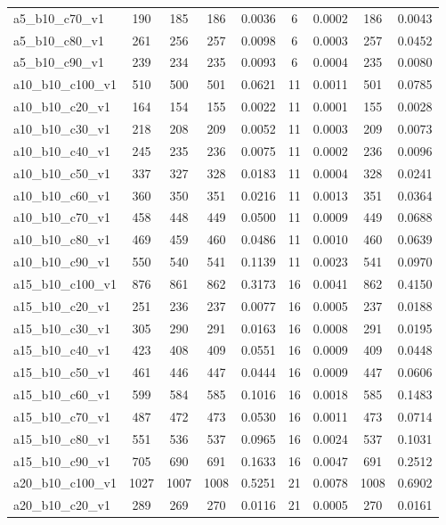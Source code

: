 \documentclass[11pt, a4paper]{article}
\begin{document}
\begin{table}[htbp]
{\begin{tabular}{@{} l cc ccc ccc @{}}
a5\_b10\_c70\_v1 & 190 & 185 & 186 & 0.0036 & 6 & 0.0002 & 186 & 0.0043 \\
a5\_b10\_c80\_v1 & 261 & 256 & 257 & 0.0098 & 6 & 0.0003 & 257 & 0.0452 \\
a5\_b10\_c90\_v1 & 239 & 234 & 235 & 0.0093 & 6 & 0.0004 & 235 & 0.0080 \\
a10\_b10\_c100\_v1 & 510 & 500 & 501 & 0.0621 & 11 & 0.0011 & 501 & 0.0785 \\
a10\_b10\_c20\_v1 & 164 & 154 & 155 & 0.0022 & 11 & 0.0001 & 155 & 0.0028 \\
a10\_b10\_c30\_v1 & 218 & 208 & 209 & 0.0052 & 11 & 0.0003 & 209 & 0.0073 \\
a10\_b10\_c40\_v1 & 245 & 235 & 236 & 0.0075 & 11 & 0.0002 & 236 & 0.0096 \\
a10\_b10\_c50\_v1 & 337 & 327 & 328 & 0.0183 & 11 & 0.0004 & 328 & 0.0241 \\
a10\_b10\_c60\_v1 & 360 & 350 & 351 & 0.0216 & 11 & 0.0013 & 351 & 0.0364 \\
a10\_b10\_c70\_v1 & 458 & 448 & 449 & 0.0500 & 11 & 0.0009 & 449 & 0.0688 \\
a10\_b10\_c80\_v1 & 469 & 459 & 460 & 0.0486 & 11 & 0.0010 & 460 & 0.0639 \\
a10\_b10\_c90\_v1 & 550 & 540 & 541 & 0.1139 & 11 & 0.0023 & 541 & 0.0970 \\
a15\_b10\_c100\_v1 & 876 & 861 & 862 & 0.3173 & 16 & 0.0041 & 862 & 0.4150 \\
a15\_b10\_c20\_v1 & 251 & 236 & 237 & 0.0077 & 16 & 0.0005 & 237 & 0.0188 \\
a15\_b10\_c30\_v1 & 305 & 290 & 291 & 0.0163 & 16 & 0.0008 & 291 & 0.0195 \\
a15\_b10\_c40\_v1 & 423 & 408 & 409 & 0.0551 & 16 & 0.0009 & 409 & 0.0448 \\
a15\_b10\_c50\_v1 & 461 & 446 & 447 & 0.0444 & 16 & 0.0009 & 447 & 0.0606 \\
a15\_b10\_c60\_v1 & 599 & 584 & 585 & 0.1016 & 16 & 0.0018 & 585 & 0.1483 \\
a15\_b10\_c70\_v1 & 487 & 472 & 473 & 0.0530 & 16 & 0.0011 & 473 & 0.0714 \\
a15\_b10\_c80\_v1 & 551 & 536 & 537 & 0.0965 & 16 & 0.0024 & 537 & 0.1031 \\
a15\_b10\_c90\_v1 & 705 & 690 & 691 & 0.1633 & 16 & 0.0047 & 691 & 0.2512 \\
a20\_b10\_c100\_v1 & 1027 & 1007 & 1008 & 0.5251 & 21 & 0.0078 & 1008 & 0.6902 \\
a20\_b10\_c20\_v1 & 289 & 269 & 270 & 0.0116 & 21 & 0.0005 & 270 & 0.0161 \\

\end{tabular}}
\end{table}
\end{document}
